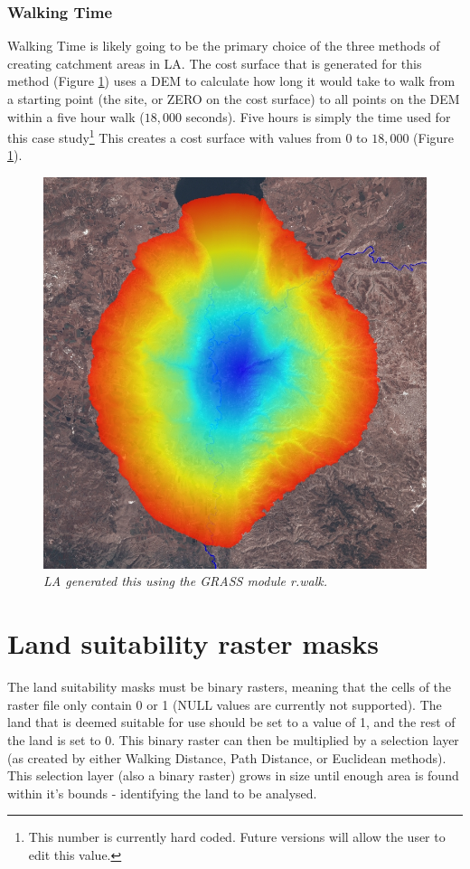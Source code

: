     \subsubsection{Walking Time}
      Walking Time is likely going to be the primary choice of the three methods of
      creating catchment areas in LA.  The cost surface that is
      generated for this method (Figure \ref{fig:rwalk}) uses a DEM to calculate
      how long it would take to walk from a starting point (the site, or ZERO on
      the cost surface) to all points on the DEM within a five hour walk ($18,000$
      seconds). Five hours is simply the time used for this case
      study\footnote{This number is currently hard coded. Future versions will
      allow the user to edit this value.} This creates a cost surface with values
      from $0$ to $18,000$ (Figure \ref{fig:rwalk}).  
\begin{figure}[htbp] 
  \includegraphics[scale=0.29]{./images/rwalkShuna.jpg}
  \caption{\label{fig:rwalk}\textit{LA generated this using the GRASS module r.walk.}}
\end{figure}
\section{Land suitability raster masks} 
  The land suitability masks must be binary rasters, meaning that the cells of
  the raster file only contain 0 or 1 (NULL values are currently not supported).
  The land that is deemed suitable for use should be set to a value of 1, and the
  rest of the land is set to 0.  This binary raster  can then be multiplied by a
  selection layer (as created by either Walking Distance, Path Distance,
  or Euclidean methods).  This selection layer (also a binary raster) grows in
  size until enough area is
  found within it's bounds - identifying the land to be analysed.

